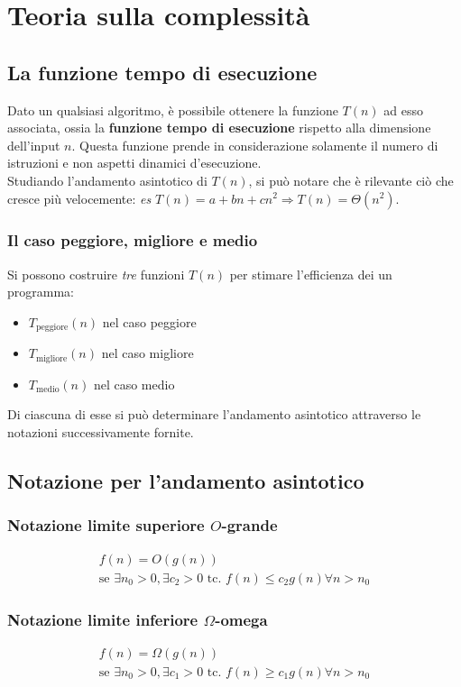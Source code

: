 \chapter{Teoria sulla complessità}
\section{La funzione tempo di esecuzione}
Dato un qualsiasi algoritmo, è possibile ottenere la funzione $T(n)$ ad esso associata, ossia la \textbf{funzione tempo di esecuzione} rispetto alla dimensione dell'input $n$. Questa funzione prende in considerazione solamente il numero di istruzioni e non aspetti dinamici d'esecuzione.\\
Studiando l'andamento asintotico di $T(n)$, si può notare che è rilevante ciò che cresce più velocemente:
\textit{es} $T(n)=a+bn+cn^2 \Rightarrow T(n) = \varTheta(n^2)$.
\subsection*{Il caso peggiore, migliore e medio}
Si possono costruire \textit{tre} funzioni $T(n)$ per stimare l'efficienza dei un programma:
\begin{itemize}[noitemsep, nolistsep]
	\item $T_\text{peggiore}(n)$ nel caso peggiore
	\item $T_\text{migliore}(n)$ nel caso migliore
	\item $T_\text{medio}(n)$ nel caso medio
\end{itemize}
\vspace{10px}
Di ciascuna di esse si può determinare l'andamento asintotico attraverso le notazioni successivamente fornite.

\section{Notazione per l'andamento asintotico}
\subsection*{Notazione limite superiore $O$-grande}
\begin{gather*}
f(n)=O(g(n))\\
\text{se } \exists n_0 >0, \exists c_2 >0 \text{ tc. } f(n)\leq c_2 g(n) \forall n>n_0
\end{gather*}

\subsection*{Notazione limite inferiore $\varOmega$-omega}
\begin{gather*}
f(n)=\varOmega(g(n))\\
\text{se } \exists n_0 >0, \exists c_1 >0 \text{ tc. } f(n)\geq c_1 g(n) \forall n>n_0
\end{gather*}

